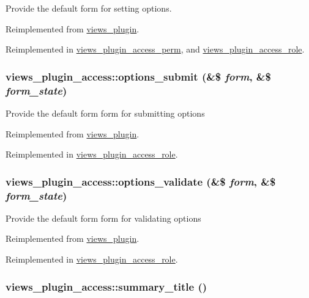 Provide the default form for setting options. 

Reimplemented from \hyperlink{classviews__plugin_1aaed8da1afd9f45293a37358c159837}{views\_\-plugin}.

Reimplemented in \hyperlink{classviews__plugin__access__perm_f662e29c6b61b1a476b7b9ba368f5650}{views\_\-plugin\_\-access\_\-perm}, and \hyperlink{classviews__plugin__access__role_76293d33e84a78e2ce0df6df955da760}{views\_\-plugin\_\-access\_\-role}.\hypertarget{classviews__plugin__access_d0610dfaa0e225c5d2cd85c7a13287fd}{
\subsubsection[{options\_\-submit}]{\setlength{\rightskip}{0pt plus 5cm}views\_\-plugin\_\-access::options\_\-submit (\&\$ {\em form}, \/  \&\$ {\em form\_\-state})}}
\label{classviews__plugin__access_d0610dfaa0e225c5d2cd85c7a13287fd}


Provide the default form form for submitting options 

Reimplemented from \hyperlink{classviews__plugin_442b0f392deb52725ec8159e05654e06}{views\_\-plugin}.

Reimplemented in \hyperlink{classviews__plugin__access__role_d9bf6eddd91a7c224fb813a58077ee4d}{views\_\-plugin\_\-access\_\-role}.\hypertarget{classviews__plugin__access_1ac0bea409be6ef8d7eb4bfafcf760c6}{
\subsubsection[{options\_\-validate}]{\setlength{\rightskip}{0pt plus 5cm}views\_\-plugin\_\-access::options\_\-validate (\&\$ {\em form}, \/  \&\$ {\em form\_\-state})}}
\label{classviews__plugin__access_1ac0bea409be6ef8d7eb4bfafcf760c6}


Provide the default form form for validating options 

Reimplemented from \hyperlink{classviews__plugin_46d72eb35feea36fed83cd1355a47431}{views\_\-plugin}.

Reimplemented in \hyperlink{classviews__plugin__access__role_82fda91cd55acbbcac1759448c8fc471}{views\_\-plugin\_\-access\_\-role}.\hypertarget{classviews__plugin__access_de500a95e599deffa417f8cbdd67bbf4}{
\subsubsection[{summary\_\-title}]{\setlength{\rightskip}{0pt plus 5cm}views\_\-plugin\_\-access::summary\_\-title ()}}
\label{classviews__plugin__access_de500a95e599deffa417f8cbdd67bbf4}


